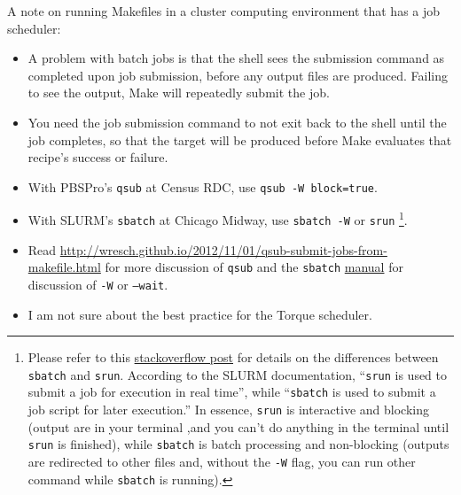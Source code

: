 A note on running Makefiles in a cluster computing environment that has a job scheduler:
\begin{itemize}
	\item A problem with batch jobs is that the shell sees the submission command as completed upon job submission, before any output files are produced.
	Failing to see the output, Make will repeatedly submit the job.
	\item You need the job submission command to not exit back to the shell until the job completes, so that the target will be produced before Make evaluates that recipe's success or failure.
	\item With PBSPro's \texttt{qsub} at Census RDC, use \texttt{qsub -W block=true}.
	\item With SLURM's \texttt{sbatch} at Chicago Midway, use \texttt{sbatch -W} or \texttt{srun}%
		\footnote{
			Please refer to this \href{https://stackoverflow.com/questions/43767866/slurm-srun-vs-sbatch-and-their-parameters}{stackoverflow post}
				for details on the differences
				between \texttt{sbatch} and \texttt{srun}.
			According to the SLURM documentation,
				``\texttt{srun} is used to submit a job for execution in real time'',
				while ``\texttt{sbatch} is used to submit a job script for later execution.''
			In essence, \texttt{srun} is interactive and blocking
				(output are in your terminal ,and
				you can't do anything in the terminal until \texttt{srun} is finished),
				while \texttt{sbatch} is batch processing and non-blocking
				(outputs are redirected to other files and,
				without the \texttt{-W} flag,
				you can run other command while \texttt{sbatch} is running).
		}.
	\item Read \url{http://wresch.github.io/2012/11/01/qsub-submit-jobs-from-makefile.html} for more discussion of \texttt{qsub} and the \texttt{sbatch} \href{https://slurm.schedmd.com/sbatch.html}{manual} for discussion of \texttt{-W} or \texttt{--wait}.
	\item I am not sure about the best practice for the Torque scheduler.
\end{itemize}
